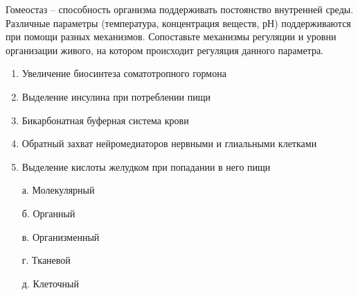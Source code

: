 
Гомеостаз – способность организма поддерживать постоянство внутренней среды. 
Различные параметры (температура, концентрация веществ, рН) поддерживаются при 
помощи разных механизмов. Сопоставьте механизмы регуляции и уровни организации живого, 
на котором происходит регуляция данного параметра.

\begin{enumerate}
    \item Увеличение биосинтеза соматотропного гормона
    \item Выделение инсулина при потреблении пищи
    \item Бикарбонатная буферная система крови
    \item Обратный захват нейромедиаторов нервными и глиальными клетками
    \item Выделение кислоты желудком при попадании в него пищи
\end{enumerate}
    
\begin{enumerate}
    \item[а.] Молекулярный
    \item[б.] Органный
    \item[в.] Организменный
    \item[г.] Тканевой
    \item[д.] Клеточный
\end{enumerate}

